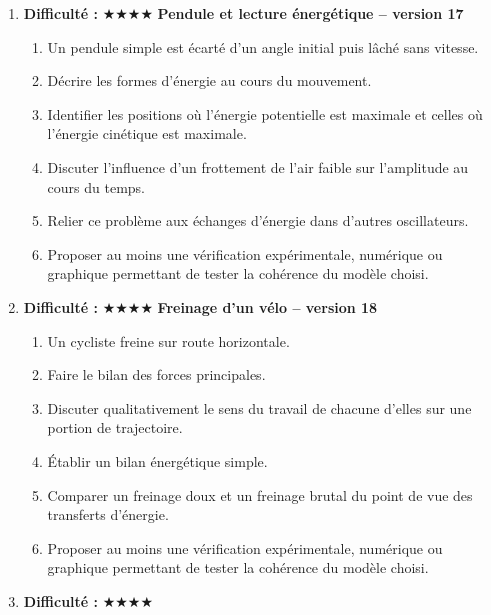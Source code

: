 \documentclass[11pt,a4paper]{article}
\newcommand{\etoiles}[1]{\textbf{Difficulté : }#1}
\begin{document}
\begin{enumerate}[label=\textbf{Problème long \arabic*.},leftmargin=*]
\begin{enumerate}[label=\alph*)]
\item Analyser les variations d'énergie cinétique, potentielle et mécanique entre les différentes phases.
\item Identifier les phases conservatrices et dissipatives.
\item Proposer un modèle énergétique simple du choc.
\item Proposer au moins une vérification expérimentale, numérique ou graphique permettant de tester la cohérence du modèle choisi.
\end{enumerate}
\item \etoiles{★★★★}
\textbf{Pendule et lecture énergétique -- version 17}
\begin{enumerate}[label=\alph*)]
\item Un pendule simple est écarté d'un angle initial puis lâché sans vitesse.
\item Décrire les formes d'énergie au cours du mouvement.
\item Identifier les positions où l'énergie potentielle est maximale et celles où l'énergie cinétique est maximale.
\item Discuter l'influence d'un frottement de l'air faible sur l'amplitude au cours du temps.
\item Relier ce problème aux échanges d'énergie dans d'autres oscillateurs.
\item Proposer au moins une vérification expérimentale, numérique ou graphique permettant de tester la cohérence du modèle choisi.
\end{enumerate}
\item \etoiles{★★★★}
\textbf{Freinage d'un vélo -- version 18}
\begin{enumerate}[label=\alph*)]
\item Un cycliste freine sur route horizontale.
\item Faire le bilan des forces principales.
\item Discuter qualitativement le sens du travail de chacune d'elles sur une portion de trajectoire.
\item Établir un bilan énergétique simple.
\item Comparer un freinage doux et un freinage brutal du point de vue des transferts d'énergie.
\item Proposer au moins une vérification expérimentale, numérique ou graphique permettant de tester la cohérence du modèle choisi.
\end{enumerate}
\item \etoiles{★★★★}

\end{enumerate}
\end{document}
